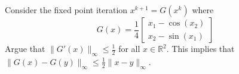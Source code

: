 \documentclass[12pt, leqno]{article}
\begin{document}

Consider the fixed point iteration $x^{k+1} = G(x^k)$ where
\[
G(x) = \frac{1}{4} \begin{bmatrix}
  x_1 - \cos(x_2) \\
  x_2 - \sin(x_1)
\end{bmatrix}
\]
Argue that $\|G'(x)\|_\infty \leq \frac{1}{2}$ for all $x \in
\mathbb{R}^2$.
This implies that $\|G(x)-G(y)\|_\infty \leq \frac{1}{2} \|x-y\|_\infty$.
\end{document}

